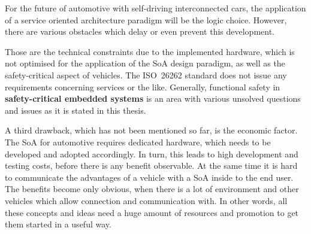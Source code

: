 For the future of automotive with self-driving interconnected cars, the application of a service oriented architecture paradigm will be the logic choice. However, there are various obstacles which delay or even prevent this development.

Those are the technical constraints due to the implemented hardware, which is not optimised for the application of the SoA design paradigm, as well as the safety-critical aspect of vehicles. The \mbox{ISO 26262} standard does not issue any requirements concerning services or the like. Generally, functional safety in \textbf{safety-critical embedded systems} is an area with various unsolved questions and issues as it is stated in this thesis.

A third drawback, which has not been mentioned so far, is the economic factor. The SoA for automotive requires dedicated hardware, which needs to be developed and adopted accordingly. In turn, this leads to high development and testing costs, before there is any benefit observable. At the same time it is hard to communicate the advantages of a vehicle with a SoA inside to the end user. The benefits become only obvious, when there is a lot of environment and other vehicles which allow connection and communication with. In other words, all these concepts and ideas need a huge amount of resources and promotion to get them started in a useful way.